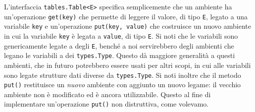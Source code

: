 %
L'interfaccia \texttt{tables.Table<E>} specifica semplicemente che un ambiente
ha un'operazione \texttt{get(key)}
che permette di leggere il valore, di tipo \texttt{E}, legato
a una variabile \texttt{key} e un'operazione
\texttt{put(key, value)} che costruisce un nuovo ambiente in cui
la variabile \texttt{key} \`e legata a \texttt{value}, di tipo \texttt{E}.
Si noti che le variabili sono genericamente legate a degli
\texttt{E}, bench\'e a noi servirebbero degli ambienti che legano
le variabili a dei \texttt{types.Type}. Questo d\`a maggiore generalit\`a
a questi ambienti, che in futuro potrebbero essere usati per altri scopi,
in cui alle variabili sono legate strutture dati diverse da \texttt{types.Type}.
Si noti inoltre che il metodo \texttt{put()} restituisce un \emph{nuovo}
ambiente con aggiunto
un nuovo legame: il vecchio ambiente non \`e modificato
ed \`e ancora utilizzabile. Questo al fine di implementare un'operazione
\texttt{put()} non distruttiva, come volevamo.

